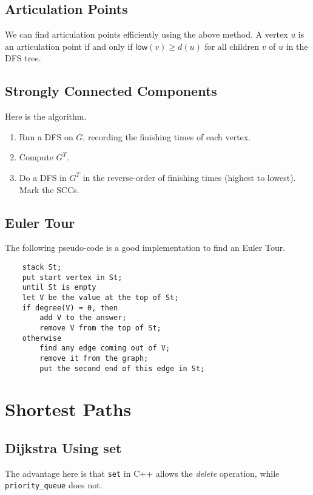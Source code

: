 \documentclass[12pt,a4paper]{amsart}
\numberwithin{equation}{section}
\theoremstyle{definition}
\begin{document}
\subsection{Articulation Points} We can find articulation points efficiently using the above method. A vertex $u$ is an articulation point if and only if $\mathsf{low}(v) \ge d(u)$ for all children $v$ of $u$ in the DFS tree.  

\subsection{Strongly Connected Components} Here is the algorithm. 

\begin{enumerate}
    \item Run a DFS on $G$, recording the finishing times of each vertex. 
    \item Compute $G^T$. 
    \item Do a DFS in $G^T$ in the reverse-order of finishing times (highest to lowest). Mark the SCCs.
\end{enumerate}

\subsection{Euler Tour} The following pseudo-code is a good implementation to find an Euler Tour.

\begin{lstlisting}
    stack St;
    put start vertex in St;
    until St is empty
    let V be the value at the top of St;
    if degree(V) = 0, then
        add V to the answer;
        remove V from the top of St;
    otherwise
        find any edge coming out of V;
        remove it from the graph;
        put the second end of this edge in St;
\end{lstlisting}

\section{Shortest Paths}

\subsection{Dijkstra Using set} The advantage here is that \verb|set| in C++ allows the \textit{delete} operation, while \verb|priority_queue| does not. 
\end{document}
